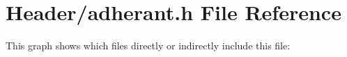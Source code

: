 \section{Header/adherant.h File Reference}
\label{adherant_8h}
This graph shows which files directly or indirectly include this file\+:
